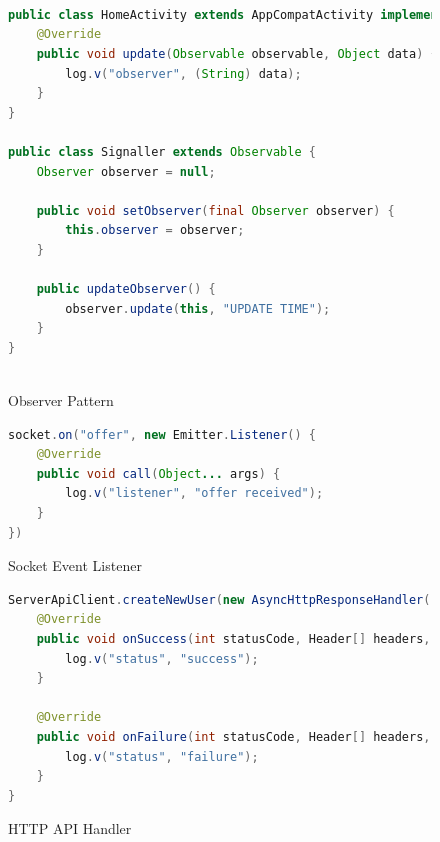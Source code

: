 \documentclass[]{report}
\begin{document}
	\chapter{}
	\begin{figure}[h!]
		\caption{Observer Pattern}
		\begin{lstlisting}[language=Java,frame=single,breaklines=true]
		
public class HomeActivity extends AppCompatActivity implements Observer {
	@Override
	public void update(Observable observable, Object data) {
		log.v("observer", (String) data);
	}
}

public class Signaller extends Observable {
	Observer observer = null;

	public void setObserver(final Observer observer) {
		this.observer = observer;
	}

	public updateObserver() {
		observer.update(this, "UPDATE TIME");
	}
}
		
		\end{lstlisting}
	\end{figure}
	\begin{figure}[h!]
		\caption{Socket Event Listener}
		\begin{lstlisting}[language=Java,frame=single,breaklines=true]
socket.on("offer", new Emitter.Listener() {
	@Override
	public void call(Object... args) {
		log.v("listener", "offer received");
	}
})
		\end{lstlisting}
	\end{figure}
	\begin{figure}[h!]
		\caption{HTTP API Handler}
		\begin{lstlisting}[language=Java,frame=single,breaklines=true]
ServerApiClient.createNewUser(new AsyncHttpResponseHandler() {
	@Override
	public void onSuccess(int statusCode, Header[] headers, byte[] responseBody) {
		log.v("status", "success");
	}
	
	@Override
	public void onFailure(int statusCode, Header[] headers, byte[] responseBody, Throwable error) {
		log.v("status", "failure");
	}
}
		\end{lstlisting}
	\end{figure}
	
\end{document}
